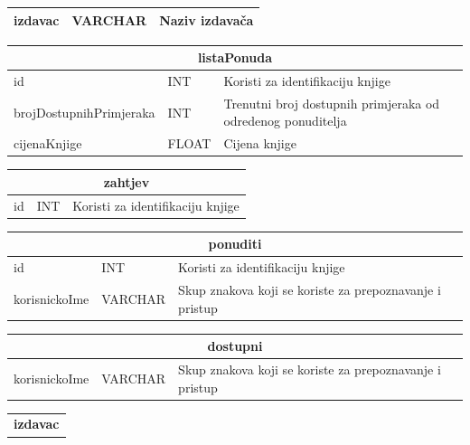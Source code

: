 \begin{center}
\begin{tabular}{ |p{4cm}|p{3cm}|p{5cm}|  }
					\hline
					izdavac & VARCHAR & Naziv izdavača\\
					\hline
				\end{tabular}
				\vspace{1cm}
				\begin{tabular}{ |p{4cm}|p{3cm}|p{5cm}|  }
					\hline
					\multicolumn{3}{|c|}{\textbf{listaPonuda}} \\
					\bottomrule[2pt]
					\cellcolor{blue!10}id & INT & Koristi za identifikaciju knjige\\
					\hline
					brojDostupnihPrimjeraka & INT & Trenutni broj dostupnih primjeraka od odredenog ponuditelja\\
					\hline
					cijenaKnjige & FLOAT & Cijena knjige\\
					\hline
				\end{tabular}
				\vspace{1cm}
				\begin{tabular}{ |p{4cm}|p{3cm}|p{5cm}|  }
					\hline
					\multicolumn{3}{|c|}{\textbf{zahtjev}} \\
					\bottomrule[2pt]
					\cellcolor{blue!10}id & INT &Koristi za identifikaciju knjige\\
					\hline
				\end{tabular}
				\vspace{1cm}
				\begin{tabular}{ |p{4cm}|p{3cm}|p{5cm}|  }
					\hline
					\multicolumn{3}{|c|}{\textbf{ponuditi}} \\
					\bottomrule[2pt]
					\cellcolor{blue!10}id & INT & Koristi za identifikaciju knjige\\
					\hline
					\cellcolor{blue!10}korisnickoIme & VARCHAR & Skup znakova koji se koriste za prepoznavanje i pristup\\
					\hline
				\end{tabular}
				\vspace{1cm}
				\begin{tabular}{ |p{4cm}|p{3cm}|p{5cm}|  }
					\hline
					\multicolumn{3}{|c|}{\textbf{dostupni}} \\
					\bottomrule[2pt]
					\cellcolor{blue!10}korisnickoIme & VARCHAR & Skup znakova koji se koriste za prepoznavanje i pristup\\
					\hline
				\end{tabular}
				\vspace{1cm}
				\begin{tabular}{ |p{4cm}|p{3cm}|p{5cm}|  }
					\hline
					\multicolumn{3}{|c|}{\textbf{izdavac}} \\

\end{tabular}
\end{center}
